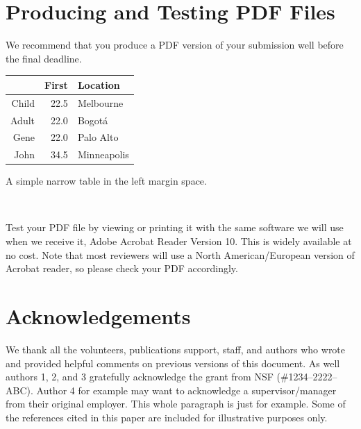 \documentclass{sigchi-ext}
\begin{document}
\section{Producing and Testing PDF Files}
We recommend that you produce a PDF version of your submission well
before the final deadline.


\begin{margintable}[1pc]
  \begin{minipage}{\marginparwidth}
    \centering
    \begin{tabular}{r r l}
      & {\small \textbf{First}}
      & {\small \textbf{Location}} \\
      \toprule
      Child & 22.5 & Melbourne \\
      Adult & 22.0 & Bogot\'a \\
      \midrule
      Gene & 22.0 & Palo Alto \\
      John & 34.5 & Minneapolis \\
      \bottomrule
    \end{tabular}
    \caption{A simple narrow table in the left margin
      space.}~\label{tab:table2}
  \end{minipage}
\end{margintable}
Test your PDF file by viewing or printing it with the same software we
will use when we receive it, Adobe Acrobat Reader Version 10. This is
widely available at no cost. Note that most
reviewers will use a North American/European version of Acrobat
reader, so please check your PDF accordingly.

\section{Acknowledgements}
We thank all the volunteers, publications support, staff, and authors
who wrote and provided helpful comments on previous versions of this
document. As well authors 1, 2, and 3 gratefully acknowledge the grant
from NSF (\#1234--2222--ABC). Author 4 for example may want to
acknowledge a supervisor/manager from their original employer. This
whole paragraph is just for example. Some of the references cited in
this paper are included for illustrative purposes only.
\end{document}
